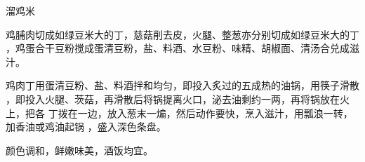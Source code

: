 \begin{recipe}{溜鸡米}

\ingredients


\preparation

\step 鸡脯肉切成如绿豆米大的丁，慈菇削去皮，火腿、整葱亦分别切成如绿豆米大的丁
，鸡蛋合干豆粉搅成蛋清豆粉，盐、料酒、水豆粉、味精、胡椒面、清汤合兑成滋汁。

\step 鸡肉丁用蛋清豆粉、盐、料酒拌和均匀，即投入炙过的五成热的油锅，用筷子滑散
，即投入火腿、茨菇，再滑散后将锅提离火口，泌去油剩约一两，再将锅放在火上，把各
丁拨在一边，放入葱末一煸，然后动作要快，烹入滋汁，用瓢浪一转，加香油或鸡油起锅
，盛入深色条盘。

\features

颜色调和，鲜嫩味美，酒饭均宜。

\end{recipe}

